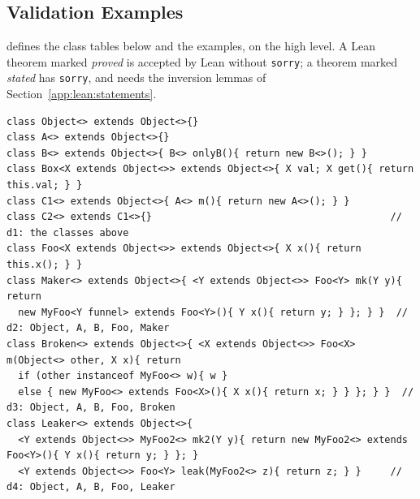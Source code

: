 \subsection{Validation Examples}
\label{app:lean:examples}
 defines the class tables below and the examples, on the high level.
A Lean theorem marked \emph{proved} is accepted by Lean without \texttt{sorry}; a theorem marked \emph{stated} has \texttt{sorry}, and needs the inversion lemmas of Section~\ref{app:lean:statements}.
\begin{lstlisting}
class Object<> extends Object<>{}
class A<> extends Object<>{}
class B<> extends Object<>{ B<> onlyB(){ return new B<>(); } }
class Box<X extends Object<>> extends Object<>{ X val; X get(){ return this.val; } }
class C1<> extends Object<>{ A<> m(){ return new A<>(); } }
class C2<> extends C1<>{}                                         // d1: the classes above
class Foo<X extends Object<>> extends Object<>{ X x(){ return this.x(); } }
class Maker<> extends Object<>{ <Y extends Object<>> Foo<Y> mk(Y y){ return
  new MyFoo<Y funnel> extends Foo<Y>(){ Y x(){ return y; } }; } }  // d2: Object, A, B, Foo, Maker
class Broken<> extends Object<>{ <X extends Object<>> Foo<X> m(Object<> other, X x){ return
  if (other instanceof MyFoo<> w){ w }
  else { new MyFoo<> extends Foo<X>(){ X x(){ return x; } } }; } }  // d3: Object, A, B, Foo, Broken
class Leaker<> extends Object<>{
  <Y extends Object<>> MyFoo2<> mk2(Y y){ return new MyFoo2<> extends Foo<Y>(){ Y x(){ return y; } }; }
  <Y extends Object<>> Foo<Y> leak(MyFoo2<> z){ return z; } }     // d4: Object, A, B, Foo, Leaker
\end{lstlisting}
